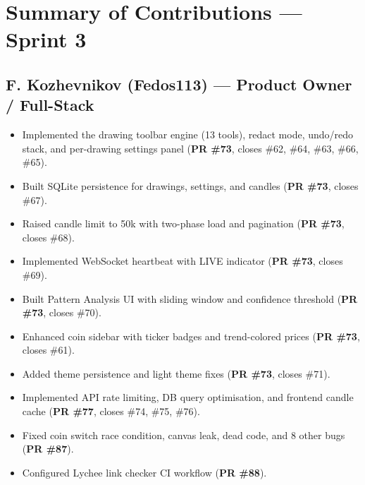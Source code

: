 \documentclass[11pt,a4paper]{article}
\begin{document}
\section{Summary of Contributions --- Sprint 3}

\subsection{F. Kozhevnikov (Fedos113) --- Product Owner / Full-Stack}
\begin{itemize}[leftmargin=*]
    \item Implemented the drawing toolbar engine (13 tools), redact mode, undo/redo stack, and per-drawing settings panel (\textbf{PR \#73}, closes \#62, \#64, \#63, \#66, \#65).
    \item Built SQLite persistence for drawings, settings, and candles (\textbf{PR \#73}, closes \#67).
    \item Raised candle limit to 50k with two-phase load and pagination (\textbf{PR \#73}, closes \#68).
    \item Implemented WebSocket heartbeat with LIVE indicator (\textbf{PR \#73}, closes \#69).
    \item Built Pattern Analysis UI with sliding window and confidence threshold (\textbf{PR \#73}, closes \#70).
    \item Enhanced coin sidebar with ticker badges and trend-colored prices (\textbf{PR \#73}, closes \#61).
    \item Added theme persistence and light theme fixes (\textbf{PR \#73}, closes \#71).
    \item Implemented API rate limiting, DB query optimisation, and frontend candle cache (\textbf{PR \#77}, closes \#74, \#75, \#76).
    \item Fixed coin switch race condition, canvas leak, dead code, and 8 other bugs (\textbf{PR \#87}).
    \item Configured Lychee link checker CI workflow (\textbf{PR \#88}).
\end{itemize}
\end{document}
